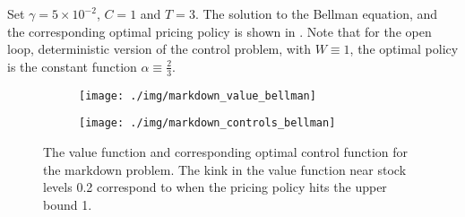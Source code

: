 \documentclass[main.tex]{subfiles}
\begin{document}
Set $\gamma = 5\times 10^{-2}$, $C=1$ and $T=3$.
The solution to the Bellman equation, and the corresponding optimal
pricing policy is shown in .
Note that for the open loop,
deterministic version of the control problem, with
$W\equiv 1$, the optimal policy is the constant function
$\alpha\equiv \frac{2}{3}$.
\begin{figure}[ht]
  \centering
  \begin{subfigure}[b]{0.5\textwidth}
    \texttt{[image: ./img/markdown\_value\_bellman]}
  \end{subfigure}%
  \begin{subfigure}[b]{0.5\textwidth}
    \texttt{[image: ./img/markdown\_controls\_bellman]}
  \end{subfigure}
  \caption{The value function and corresponding
    optimal control function for the markdown problem.
    The kink in the value function near stock levels 0.2
    correspond to when the pricing policy hits the upper bound 1.
  }\label{fig:markdown_bellman}
\end{figure}


\biblio
\end{document}
